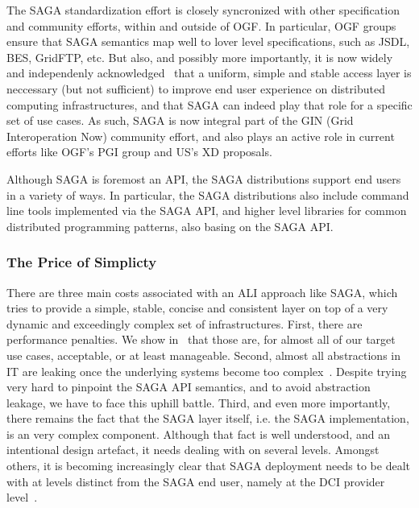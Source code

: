 \documentclass[10pt,conference,final,letterpaper,twoside,twocolumn,]{IEEEtran}
\begin{document}
 The SAGA standardization effort is closely syncronized with other
 specification and community efforts, within and outside of OGF.  In
 particular, OGF groups ensure that SAGA semantics map well to lover
 level specifications, such as JSDL, BES, GridFTP, etc.   But also,
 and possibly more importantly, it is now widely and independenly
 acknowledged~\cite{XD,EGI,UMD,Naregi} that a uniform, simple and
 stable access layer is neccessary (but not sufficient) to improve end
 user experience on distributed computing infrastructures, and that
 SAGA can indeed play that role for a specific set of use cases.  As
 such, SAGA is now integral part of the GIN (Grid Interoperation Now)
 community effort, and also plays an active role in current efforts
 like OGF's PGI group and US's XD proposals.
  
 Although SAGA is foremost an API, the SAGA distributions support end
 users in a variety of ways.  In particular, the SAGA distributions
 also include command line tools implemented via the SAGA API, and
 higher level libraries for common distributed programming patterns,
 also basing on the SAGA API.


 \subsubsection*{The Price of Simplicty\cite{sagaprice}}

  There are three main costs associated with an ALI approach like
  SAGA, which tries to provide a simple, stable, concise and
  consistent layer on top of a very dynamic and exceedingly complex
  set of infrastructures.  First, there are performance penalties.  We
  show in~\cite{sagaperf} that those are, for almost all of our target
  use cases, acceptable, or at least manageable.  Second, almost all
  abstractions in IT are leaking once the underlying systems become
  too complex~\cite{leaky_abstractions}.  Despite trying very hard to
  pinpoint the SAGA API semantics, and to avoid abstraction leakage,
  we have to face this uphill battle.  Third, and even more
  importantly, there remains the fact that the SAGA layer itself, i.e.
  the SAGA implementation, is an very complex component.  Although
  that fact is well understood, and an intentional design artefact, it
  needs dealing with on several levels.  Amongst others, it is
  becoming increasingly clear that SAGA deployment needs to be dealt
  with at levels distinct from the SAGA end user, namely at the DCI
  provider level~\cite{UMD,XD,TG}.
\end{document}
